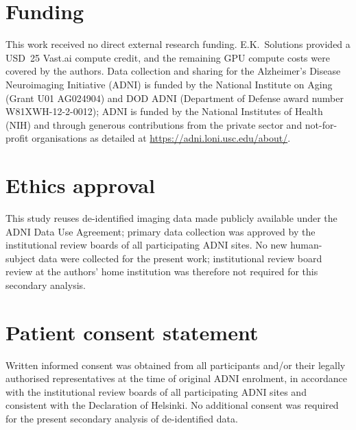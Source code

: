\documentclass[10pt,twocolumn,a4paper]{article}
\begin{document}
\section*{Funding}

This work received no direct external research funding. E.K.\
Solutions provided a USD~25 Vast.ai compute credit, and the remaining
GPU compute costs were covered by the authors. Data collection and sharing for the Alzheimer's Disease
Neuroimaging Initiative (ADNI) is funded by the National Institute
on Aging (Grant U01 AG024904) and DOD ADNI (Department of Defense
award number W81XWH-12-2-0012); ADNI is funded by the National
Institutes of Health (NIH) and through generous contributions from
the private sector and not-for-profit organisations as detailed at
\url{https://adni.loni.usc.edu/about/}.

\section*{Ethics approval}

This study reuses de-identified imaging data made publicly available
under the ADNI Data Use Agreement; primary data collection was
approved by the institutional review boards of all participating
ADNI sites. No new human-subject data were collected for the present
work; institutional review board review at the authors' home
institution was therefore not required for this secondary analysis.

\section*{Patient consent statement}

Written informed consent was obtained from all participants and/or
their legally authorised representatives at the time of original ADNI
enrolment, in accordance with the institutional review boards of all
participating ADNI sites and consistent with the Declaration of
Helsinki. No additional consent was required for the present
secondary analysis of de-identified data.
\end{document}
